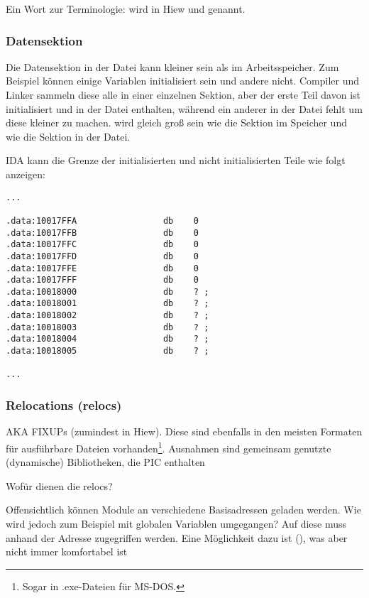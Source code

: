 Ein Wort zur Terminologie:  wird in Hiew 
und   genannt.

\subsubsection{Datensektion}
Die Datensektion in der Datei kann kleiner sein als im Arbeitsspeicher. Zum
Beispiel können einige Variablen initialisiert sein und andere nicht.
Compiler und Linker sammeln diese alle in einer einzelnen Sektion, aber
der erste Teil davon ist initialisiert und in der Datei enthalten, während
ein anderer in der Datei fehlt um diese kleiner zu machen.
 wird gleich groß sein wie die Sektion im Speicher und
 wie die Sektion in der Datei.

IDA kann die Grenze der initialisierten und nicht initialisierten Teile
wie folgt anzeigen:

\begin{lstlisting}
...

.data:10017FFA                 db    0
.data:10017FFB                 db    0
.data:10017FFC                 db    0
.data:10017FFD                 db    0
.data:10017FFE                 db    0
.data:10017FFF                 db    0
.data:10018000                 db    ? ;
.data:10018001                 db    ? ;
.data:10018002                 db    ? ;
.data:10018003                 db    ? ;
.data:10018004                 db    ? ;
.data:10018005                 db    ? ;

...
\end{lstlisting}

\subsubsection{Relocations (relocs)}
\label{subsec:relocs}

\ac{AKA} FIXUPs (zumindest in Hiew).
Diese sind ebenfalls in den meisten Formaten für ausführbare Dateien
vorhanden\footnote{Sogar in .exe-Dateien für MS-DOS.}.
Ausnahmen sind gemeinsam genutzte (dynamische) Bibliotheken, die \ac{PIC} enthalten

Wofür dienen die relocs?

Offensichtlich können Module an verschiedene Basisadressen geladen werden. Wie
wird jedoch zum Beispiel mit globalen Variablen umgegangen?
Auf diese muss anhand der Adresse zugegriffen werden. Eine Möglichkeit dazu ist
\PICcode{} (), was aber nicht immer komfortabel ist

